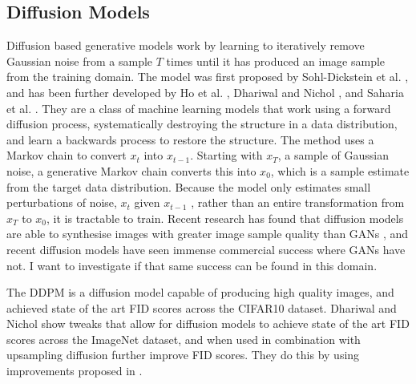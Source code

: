 \documentclass{UoYCSproject}
\begin{document}
\subsection{Diffusion Models} \label{DIFFUSION_METHODS}

Diffusion based generative models work by learning to iteratively remove Gaussian noise from a sample $ T $ times until it has produced an image sample from the training domain. The model was first proposed by Sohl-Dickstein et al. \cite{sohldickstein2015deep}, and has been further developed by Ho et al. \cite{ho2020denoising},  Dhariwal and Nichol \cite{dhariwal2021diffusion}, and Saharia et al. \cite{saharia2022palette}. They are a class of machine learning models that work using a forward diffusion process, systematically destroying the structure in a data distribution, and learn a backwards process to restore the structure. The method uses a Markov chain to convert $ x_t $ into $ x_{t-1} $. Starting with $ x_T $, a sample of Gaussian noise, a generative Markov chain converts this into $ x_0 $, which is a sample estimate from the target data distribution. Because the model only estimates small perturbations of noise, $ x_t $ given $ x_{t-1} $ , rather than an entire transformation from $ x_T $ to $ x_0 $, it is tractable to train. Recent research has found that diffusion models are able to synthesise images with greater image sample quality than GANs \cite{dhariwal2021diffusion}, and recent diffusion models \cite{ramesh2022hierarchical, saharia2022photorealistic} have seen immense commercial success where GANs have not. I want to investigate if that same success can be found in this domain.

The DDPM \cite{ho2020denoising} is a diffusion model capable of producing high quality images, and achieved state of the art FID scores across the CIFAR10 dataset. Dhariwal and Nichol \cite{dhariwal2021diffusion} show tweaks that allow for diffusion models to achieve state of the art FID scores across the ImageNet dataset, and when used in combination with upsampling diffusion further improve FID scores. They do this by using improvements proposed in \cite{song2022denoising, nichol2021improved, song2021scorebased, brock2019large, karras2019stylebased}.
\end{document}
